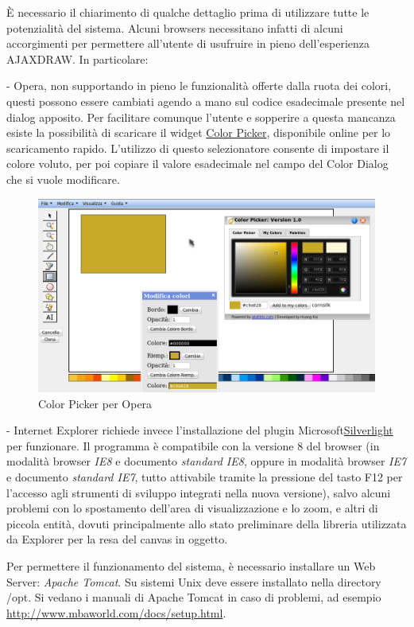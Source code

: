 \` E necessario il chiarimento di qualche dettaglio prima di utilizzare tutte le potenzialità del sistema. Alcuni browsers necessitano infatti di alcuni accorgimenti per permettere all'utente di usufruire in pieno dell'esperienza AJAXDRAW. In particolare:
\begin{elencopuntato}[\normindent]
 \item[-] Opera, non supportando in pieno le funzionalit\` a offerte dalla ruota dei colori, questi possono essere cambiati agendo a mano sul codice esadecimale presente nel dialog apposito. Per facilitare comunque l'utente e sopperire a questa mancanza esiste la possibilit\` a di scaricare il widget \href{http://widgets.opera.com/widget/11822/}{Color Picker}, disponibile online per lo scaricamento rapido. L'utilizzo di questo selezionatore consente di impostare il colore voluto, per poi copiare il valore esadecimale nel campo del Color Dialog che si vuole modificare.
 
 \begin{figure}[!ht]
\centering
\includegraphics[scale=0.5]{images/opera.png}
\caption{Color Picker per Opera}
\end{figure} 

\item[-]  Internet Explorer richiede invece l'installazione del plugin Microsoft\textcopyright   \href{http://silverlight.net/GetStarted/}{Silverlight \texttrademark} 
per funzionare. Il programma \`e compatibile con la versione 8 del browser (in modalit\` a browser \textit{IE8} e documento \textit{standard IE8}, oppure in modalit\` a browser \textit{IE7} e documento \textit{standard IE7}, tutto attivabile tramite la pressione del tasto F12 per l'accesso agli strumenti di sviluppo integrati nella nuova versione), salvo alcuni problemi con lo spostamento dell'area di visualizzazione e lo zoom, e altri di piccola entit\` a, dovuti principalmente allo stato preliminare della libreria utilizzata da Explorer per la resa del canvas in oggetto.
\end{elencopuntato}
Per permettere il funzionamento del sistema, \`e necessario installare un Web Server: \textit{Apache Tomcat}. 
Su sistemi Unix deve essere installato nella  directory /opt. Si vedano i manuali di Apache Tomcat in caso di problemi, ad esempio \href{http://www.mbaworld.com/docs/setup.html}{http://www.mbaworld.com/docs/setup.html}.

